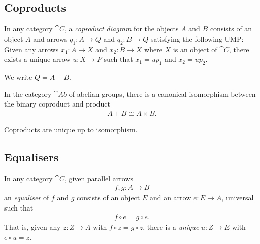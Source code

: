 \documentclass{article}
\begin{document}
\subsection{Coproducts}

\begin{definition}
    In any category $\cat C$, a \emph{coproduct diagram} for the objects $A$ and $B$
    consists of an object $A$ and arrows $q_1:A\to Q$ and $q_2:B\to Q$ satisfying
    the following UMP: Given any arrows $x_1:A\to X$ and $x_2:B\to X$ where $X$ is an
    object of $\cat C$, there exists a unique arrow $u:X\to P$ such that $x_1=up_1$
    and $x_2=up_2$.
    \begin{center}
    \end{center}
    We write $Q=A+B$.
\end{definition}

\begin{proposition}[Awodey 3.11]
    In the category $\cat{Ab}$ of abelian groups, there is a canonical isomorphism between the binary
    coproduct and product
    \begin{align*}
        A + B \cong A \times B.
    \end{align*}
\end{proposition}

\begin{proposition}[Awodey 3.12]
    Coproducts are unique up to isomorphism.
\end{proposition}

\subsection{Equalisers}

\begin{definition}
    In any category $\cat C$, given parallel arrows 
    \begin{align*}
        f,g: A\to B
    \end{align*}
    an \emph{equaliser} of $f$ and $g$ consists of an object $E$ and an arrow $e:E\to A$,
    universal such that
    \begin{align*}
        f \circ e = g \circ e.
    \end{align*}
    That is, given any $z:Z\to A$ with $f\circ z=g\circ z$, there is a \emph{unique}
    $u:Z\to E$ with $e\circ u = z$.
\end{definition}
\end{document}
